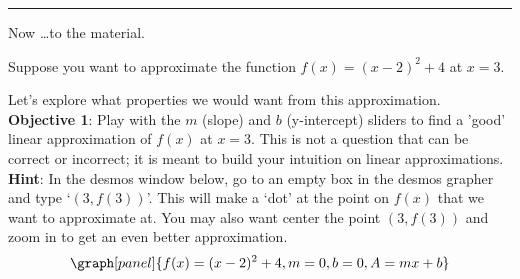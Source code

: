 \documentclass[handout,nooutcomes]{ximera}
\begin{document}
\hrule
\bigskip

Now \dots to the material.\\
\medskip

Suppose you want to approximate the function $f(x) = (x-2)^2  + 4$ at $x=3$.

Let's explore what properties we would want from this approximation.\\


{\bf Objective 1}: Play with the $m$ (slope) and $b$ (y-intercept) sliders to find
a 'good' linear approximation of $f(x)$ at $x=3$. This is not a question
that can be correct or incorrect; it is meant to build your intuition
on linear approximations.\\

\textbf{Hint}: In the desmos window below, go to an empty box in the 
desmos grapher and type `$(3,f(3))$'. This will make a `dot' at the point
on $f(x)$ that we want to approximate at. You may also want center
the point $(3, f(3))$ and zoom in to get an even better approximation.
\[
\graph[panel]{f(x) = (x-2)^2 + 4, m=0, b=0, A=mx+b}
\]
\end{document}
